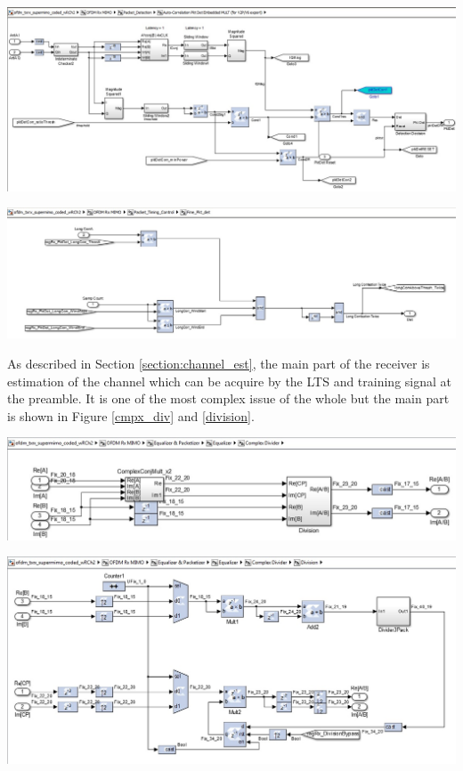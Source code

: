 \begin{center}
\includegraphics[width=\textwidth]{content/fig/autocorrblock.JPG}
\label{autocorrblock}
\end{center}

\begin{center}
\includegraphics[width=\textwidth]{content/fig/fine_packetDetect.JPG}
\label{fine_packetDetect}
\end{center}

As described in Section \ref{section:channel_est}, the main part of the receiver is estimation of the channel which can be acquire by the LTS and training signal at the preamble. It is one of the most complex issue of the whole but the main part is shown in Figure \ref{cmpx_div} and \ref{division}.\\

\begin{center}
\includegraphics[width=\textwidth]{content/fig/cmpx_div.JPG}
\label{cmpx_div}
\end{center}

\begin{center}
\includegraphics[width=\textwidth]{content/fig/division.JPG}
\label{division}
\end{center}


